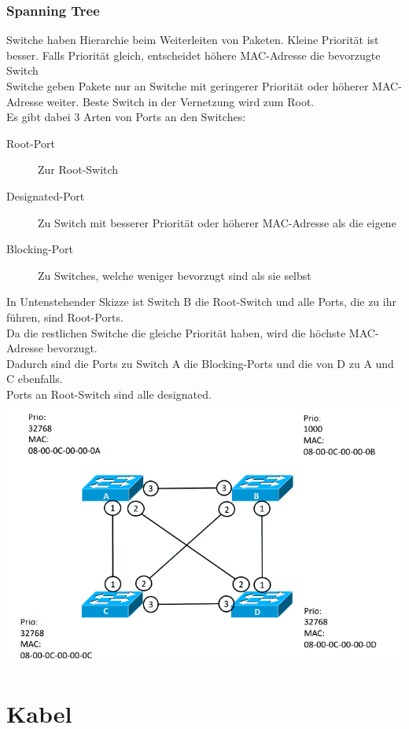 \documentclass[12pt,a4paper]{article}
\begin{document}
			\subsubsection{Spanning Tree}
				Switche haben Hierarchie beim Weiterleiten von Paketen. Kleine Priorität ist besser. Falls Priorität gleich, entscheidet höhere MAC-Adresse die bevorzugte Switch\\
				Switche geben Pakete nur an Switche mit geringerer Priorität oder höherer MAC-Adresse weiter. Beste Switch in der Vernetzung wird zum Root.\\
				Es gibt dabei 3 Arten von Ports an den Switches:
				\begin{description}
					\item[Root-Port] Zur Root-Switch
					\item[Designated-Port] Zu Switch mit besserer Priorität oder höherer MAC-Adresse als die eigene
					\item[Blocking-Port] Zu Switches, welche weniger bevorzugt sind als sie selbst 
				\end{description}
				In Untenstehender Skizze ist Switch B die Root-Switch und alle Ports, die zu ihr führen, sind Root-Ports.\\
				Da die restlichen Switche die gleiche Priorität haben, wird die höchste MAC-Adresse bevorzugt. \\
				Dadurch sind die Ports zu Switch A die Blocking-Ports und die von D zu A und C ebenfalls. \\
				Ports an Root-Switch sind alle designated.\\
				\includegraphics[width=\textwidth]{Bilder/RouterVermascht.png}

	\section{Kabel}
\end{document}

